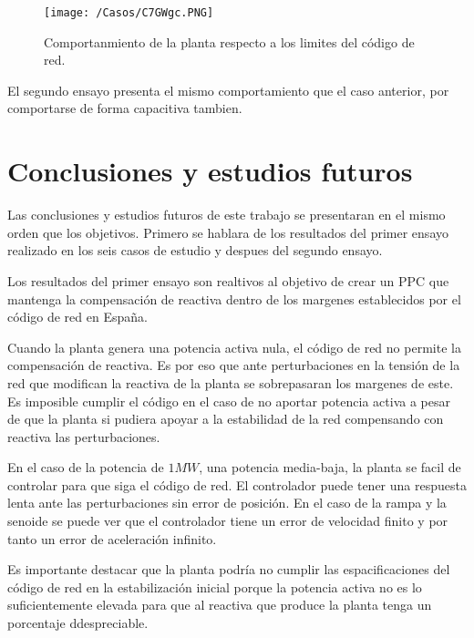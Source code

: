 \documentclass{book}
\begin{document}
\begin{figure}[h!]
\centering
\texttt{[image: /Casos/C7GWgc.PNG]}
\caption{Comportanmiento de la planta respecto a los limites del c\'odigo de red. }
\label{C7GWgc}
\end{figure} \par

El segundo ensayo presenta el mismo comportamiento que el caso anterior, por comportarse de forma capacitiva tambien. \par

\chapter{Conclusiones y estudios futuros}

Las conclusiones y estudios futuros de este trabajo se presentaran en el mismo orden que los objetivos. Primero se hablara de los resultados del primer ensayo realizado en los seis casos de estudio y despues del segundo ensayo. \par

Los resultados del primer ensayo son realtivos al objetivo de crear un PPC que mantenga la compensaci\'on de reactiva dentro de los margenes establecidos por el c\'odigo de red en España. \par

Cuando la planta genera una potencia activa nula, el c\'odigo de red no permite la compensaci\'on de reactiva. Es por eso que ante perturbaciones en la tensi\'on de la red que modifican la reactiva de la planta se sobrepasaran los margenes de este. Es imposible cumplir el c\'odigo en el caso de no aportar potencia activa a pesar de que la planta si pudiera apoyar a la estabilidad de la red compensando con reactiva las perturbaciones. \par

En el caso de la potencia de $1MW$, una potencia media-baja, la planta se facil de controlar para que siga el c\'odigo de red. El controlador puede tener una respuesta lenta ante las perturbaciones sin error de posici\'on. En el caso de la rampa y la senoide se puede ver que el controlador tiene un error de velocidad finito y por tanto un error de aceleraci\'on infinito. \par

Es importante destacar que la planta podr\'ia no cumplir las espacificaciones del c\'odigo de red en la estabilizaci\'on inicial porque la potencia activa no es lo suficientemente elevada para que al reactiva que produce la planta tenga un porcentaje ddespreciable. \par
\end{document}
